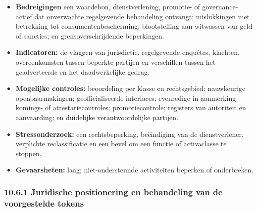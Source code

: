 \documentclass[11pt]{article}
\begin{document}
\begin{itemize}[leftmargin=*]
\item \textbf{Bedreigingen} een waardebon, dienstverlening, promotie- of governance-actief dat onverwachte regelgevende behandeling ontvangt; mislukkingen met betrekking tot consumentenbescherming; blootstelling aan witwassen van geld of sancties; en grensoverschrijdende beperkingen.
\item \textbf{Indicatoren:} de vlaggen van jurisdictie, regelgevende enquêtes, klachten, overeenkomsten tussen beperkte partijen en verschillen tussen het geadverteerde en het daadwerkelijke gedrag.
\item \textbf{Mogelijke controles:} beoordeling per klasse en rechtsgebied; nauwkeurige openbaarmakingen; geofficialiseerde interfaces; evenredige in aanmerking komings- of attestatiecontroles; promotiecontrole; registers van autoriteit en aanvaarding; en duidelijke verantwoordelijke partijen.
\item \textbf{Stressonderzoek:} een rechtsbeperking, beëindiging van de dienstverlener, verplichte reclassificatie en een bevel om een functie of activaclasse te stoppen.
\item \textbf{Gevaarsheten:} laag; niet-ondersteunde activiteiten beperken of onderbreken.
\end{itemize}
\subsubsection*{10.6.1 Juridische positionering en behandeling van de voorgestelde tokens}
\end{document}
